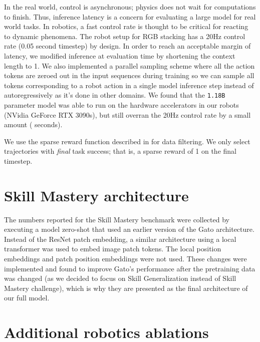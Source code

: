 \documentclass[10pt]{article} \usepackage[accepted]{tmlr}
\newcommand{\model}{{Gato}}
\begin{document}
In the real world, control is asynchronous; physics does not wait for computations to finish. Thus, inference latency is a concern for evaluating a large model for real world tasks. In robotics, a fast control rate is thought to be critical for reacting to dynamic phenomena. The robot setup for RGB stacking has a 20Hz control rate (0.05 second timestep) by design. In order to reach an acceptable margin of latency, we modified inference at evaluation time by shortening the context length to 1. We also implemented a parallel sampling scheme where all the action tokens are zeroed out in the input sequences during training so we can sample all tokens corresponding to a robot action in a single model inference step instead of autoregressively as it's done in other domains. We found that the \texttt{1.18B} parameter model was able to run on the hardware accelerators in our robots (NVidia GeForce RTX 3090s), but still overran the 20Hz control rate by a small amount ( seconds). 

We use the sparse reward function described in \cite{lee2021beyond} for data filtering. We only select trajectories with \emph{final} task success; that is, a sparse reward of 1 on the final timestep.

\section{Skill Mastery architecture}
\label{sec:skill_mastery_architecture}

The numbers reported for the Skill Mastery benchmark were collected by executing a model zero-shot that used an earlier version of the \model{} architecture. Instead of the ResNet patch embedding, a similar architecture using a local transformer was used to embed image patch tokens. The local position embeddings and patch position embeddings were not used. These changes were implemented and found to improve \model{}'s performance after the pretraining data was changed (as we decided to focus on Skill Generalization instead of Skill Mastery challenge), which is why they are presented as the final architecture of our full model.

\clearpage
\section{Additional robotics ablations}
\label{sec:sim_ablations_appendix}
\end{document}
